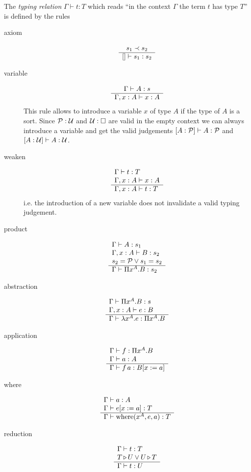 \begin{definition}
  The \emph {typing relation} $\Gamma \vdash t:T$ which reads ``in the context
  $\Gamma$ the term $t$ has type $T$'' is defined by the rules
  \begin{description}
  \item[axiom]
    $$
    \begin{array}{c} s_1 \prec s_2 \\ \hline [] \vdash s_1 : s_2\end{array}
    $$

  \item[variable]
    $$
    \begin{array}{c} \Gamma \vdash A: s \\ \hline \Gamma, x:A \vdash x:A\end{array}
    $$
    This rule allows to introduce a variable $x$ of type $A$ if the type of
    $A$ is a sort. Since ${\cal{P}} : {\cal{U}}$ and ${\cal{U}} : \Box$ are valid in the
    empty context we can always introduce a variable and get the valid
    judgements $[A: {\cal{P}}] \vdash A : {\cal{P}}$ and $[A: {\cal{U}}] \vdash A : {\cal{U}}$.

  \item[weaken]
    $$
    \begin{array}{l} \Gamma \vdash t: T
      \\
      \Gamma, x:A \vdash x:A \\ \hline \Gamma, x:A \vdash t : T\end{array}
    $$
    i.e. the introduction of a new variable does not invalidate a valid typing
    judgement.

  \item[product]
    $$
    \begin{array}{l} \Gamma \vdash A: s_1
      \\
      \Gamma,x:A \vdash B:s_2
      \\
      s_2 = {\cal{P}} \lor s_1 = s_2
     \\ \hline \Gamma \vdash \Pi x^A . B: s_2\end{array}
    $$

  \item[abstraction]
    $$
    \begin{array}{l} \Gamma \vdash \Pi x^A . B: s
      \\
      \Gamma,x:A \vdash e:B
     \\ \hline \Gamma \vdash \lambda x^A . e : \Pi x^A . B\end{array}
    $$

  \item[application]
    $$
    \begin{array}{l} \Gamma \vdash f: \Pi x^A . B
      \\
      \Gamma \vdash a:A
     \\ \hline \Gamma \vdash f \, a : B[x:=a]\end{array}
    $$

  \item[where]
    $$
    \begin{array}{l} 
        \Gamma \vdash a : A
        \\
        \Gamma \vdash e[x:=a]: T
     \\ \hline 
        \Gamma \vdash \text{where}(x^A, e, a): T
    \end{array}
    $$

  \item[reduction]
    $$
    \begin{array}{l} \Gamma \vdash t : T
      \\
      T {\,\triangleright\,} U \lor U {\,\triangleright\,} T
     \\ \hline \Gamma \vdash t: U\end{array}
    $$


\end{description}
\end{definition}
